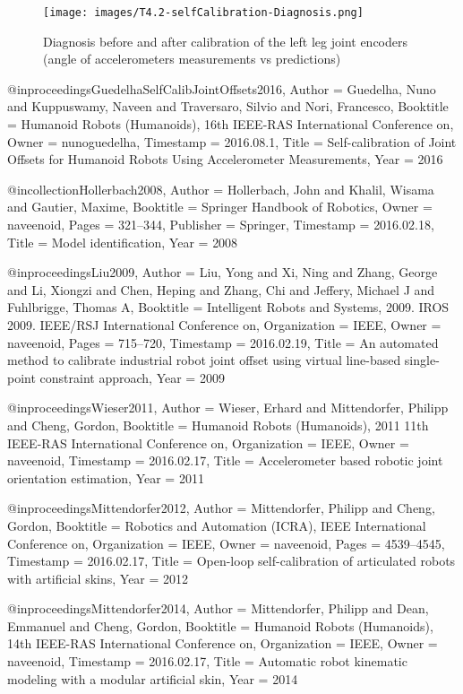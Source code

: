 \begin{figure}[hb!]
  \centering
    \texttt{[image: images/T4.2-selfCalibration-Diagnosis.png]}
    \caption{Diagnosis before and after calibration of the left leg joint encoders (angle of accelerometers measurements vs predictions)}
    \label{fig:T4.2-selfCalibration-Diagnosis}
\end{figure}



@inproceedings{GuedelhaSelfCalibJointOffsets2016,
	Author = {Guedelha, Nuno and Kuppuswamy, Naveen and Traversaro, Silvio and Nori, Francesco},
	Booktitle = {Humanoid Robots (Humanoids), 16th IEEE-RAS International Conference on},
	Owner = {nunoguedelha},
	Timestamp = {2016.08.1},
	Title = {Self-calibration of Joint Offsets for Humanoid Robots Using Accelerometer Measurements},
	Year = {2016}}


@incollection{Hollerbach2008,
	Author = {Hollerbach, John and Khalil, Wisama and Gautier, Maxime},
	Booktitle = {Springer Handbook of Robotics},
	Owner = {naveenoid},
	Pages = {321--344},
	Publisher = {Springer},
	Timestamp = {2016.02.18},
	Title = {Model identification},
	Year = {2008}}

@inproceedings{Liu2009,
	Author = {Liu, Yong and Xi, Ning and Zhang, George and Li, Xiongzi and Chen, Heping and Zhang, Chi and Jeffery, Michael J and Fuhlbrigge, Thomas A},
	Booktitle = {Intelligent Robots and Systems, 2009. IROS 2009. IEEE/RSJ International Conference on},
	Organization = {IEEE},
	Owner = {naveenoid},
	Pages = {715--720},
	Timestamp = {2016.02.19},
	Title = {An automated method to calibrate industrial robot joint offset using virtual line-based single-point constraint approach},
	Year = {2009}}


@inproceedings{Wieser2011,
	Author = {Wieser, Erhard and Mittendorfer, Philipp and Cheng, Gordon},
	Booktitle = {Humanoid Robots (Humanoids), 2011 11th IEEE-RAS International Conference on},
	Organization = {IEEE},
	Owner = {naveenoid},
	Timestamp = {2016.02.17},
	Title = {Accelerometer based robotic joint orientation estimation},
	Year = {2011}}


@inproceedings{Mittendorfer2012,
	Author = {Mittendorfer, Philipp and Cheng, Gordon},
	Booktitle = {Robotics and Automation (ICRA), IEEE International Conference on},
	Organization = {IEEE},
	Owner = {naveenoid},
	Pages = {4539--4545},
	Timestamp = {2016.02.17},
	Title = {Open-loop self-calibration of articulated robots with artificial skins},
	Year = {2012}}


@inproceedings{Mittendorfer2014,
	Author = {Mittendorfer, Philipp and Dean, Emmanuel and Cheng, Gordon},
	Booktitle = {Humanoid Robots (Humanoids), 14th IEEE-RAS International Conference on},
	Organization = {IEEE},
	Owner = {naveenoid},
	Timestamp = {2016.02.17},
	Title = {Automatic robot kinematic modeling with a modular artificial skin},
	Year = {2014}}




